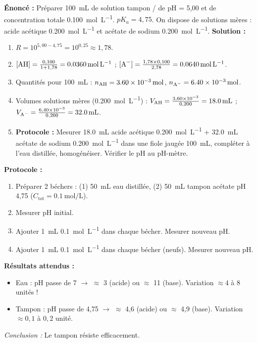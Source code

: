 \documentclass[11pt]{article}
\begin{document}
\begin{exoresolu}[Préparation tampon acétate pH = 5,0]
\textbf{Énoncé :} Préparer \SI{100}{\mL} de solution tampon / de pH = 5,00 et de concentration totale \SI{0,100}{\mol\per\L}. $pK_a = 4,75$. On dispose de solutions mères : acide acétique \SI{0,200}{\mol\per\L} et acétate de sodium \SI{0,200}{\mol\per\L}.
\textbf{Solution :}
\begin{enumerate}
  \item $R = 10^{5,00 - 4,75} = 10^{0,25} \approx 1,78$.
  \item $[\ce{AH}] = \frac{0,100}{1+1,78} = \SI{0,0360}{\mol\per\L}$ ; $[\ce{A-}] = \frac{1,78 \times 0,100}{2,78} = \SI{0,0640}{\mol\per\L}$.
  \item Quantités pour \SI{100}{\mL} : $n_{\ce{AH}} = \SI{3,60e-3}{\mol}$, $n_{\ce{A-}} = \SI{6,40e-3}{\mol}$.
  \item Volumes solutions mères (\SI{0,200}{\mol\per\L}) : $V_{\ce{AH}} = \frac{3,60 \times 10^{-3}}{0,200} = \SI{18,0}{\mL}$ ; $V_{\ce{A-}} = \frac{6,40 \times 10^{-3}}{0,200} = \SI{32,0}{\mL}$.
  \item \textbf{Protocole :} Mesurer \SI{18,0}{\mL} acide acétique \SI{0,200}{\mol\per\L} + \SI{32,0}{\mL} acétate de sodium \SI{0,200}{\mol\per\L} dans une fiole jaugée \SI{100}{\mL}, compléter à l'eau distillée, homogénéiser. Vérifier le pH au pH-mètre.
\end{enumerate}
\end{exoresolu}

\begin{experience}
\textbf{Protocole :}
\begin{enumerate}
  \item Préparer 2 béchers : (1) \SI{50}{\mL} eau distillée, (2) \SI{50}{\mL} tampon acétate pH 4,75 ($C_{\text{tot}} = \SI{0,1}{\mol\per\L}$).
  \item Mesurer pH initial.
  \item Ajouter \SI{1}{\mL}  \SI{0,1}{\mol\per\L} dans chaque bécher. Mesurer nouveau pH.
  \item Ajouter \SI{1}{\mL}  \SI{0,1}{\mol\per\L} dans chaque bécher (neufs). Mesurer nouveau pH.
\end{enumerate}
\textbf{Résultats attendus :}
\begin{itemize}
  \item Eau : pH passe de 7 $\rightarrow$ $\approx$ 3 (acide) ou $\approx$ 11 (base). Variation $\approx 4$ à $8$ unités !
  \item Tampon : pH passe de 4,75 $\rightarrow$ $\approx$ 4,6 (acide) ou $\approx$ 4,9 (base). Variation $\approx 0,1$ à $0,2$ unité.
\end{itemize}
\emph{Conclusion :} Le tampon résiste efficacement.
\end{experience}
\end{document}

